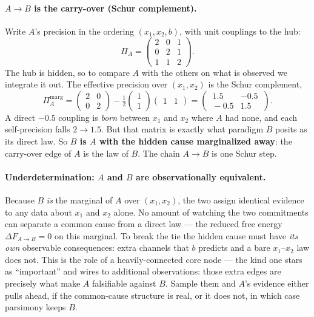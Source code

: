 \paragraph{$A\to B$ is the carry-over (Schur complement).} Write $A$'s
precision in the ordering $(x_1,x_2,b)$, with unit couplings to the hub:
\begin{equation}
\Pi_A=\begin{pmatrix}2&0&1\\0&2&1\\1&1&2\end{pmatrix}.
\end{equation}
The hub is hidden, so to compare $A$ with the others on what is observed
we integrate it out. The effective precision over $(x_1,x_2)$ is the
Schur complement,
\begin{equation}
\Pi_A^{\mathrm{marg}}
=\begin{pmatrix}2&0\\0&2\end{pmatrix}
-\tfrac12\begin{pmatrix}1\\1\end{pmatrix}\begin{pmatrix}1&1\end{pmatrix}
=\begin{pmatrix}\,1.5&-0.5\,\\[1pt]\,-0.5&1.5\,\end{pmatrix}.
\end{equation}
A direct $-0.5$ coupling is \emph{born} between $x_1$ and $x_2$ where $A$
had none, and each self-precision falls $2\to1.5$. But that matrix is
exactly what paradigm $B$ posits as its direct law. So \textbf{$B$ is $A$
with the hidden cause marginalized away}: the carry-over edge of $A$ is
the law of $B$. The chain $A\to B$ is one Schur step.

\paragraph{Underdetermination: $A$ and $B$ are observationally
equivalent.} Because $B$ \emph{is} the marginal of $A$ over $(x_1,x_2)$,
the two assign identical evidence to any data about $x_1$ and $x_2$
alone. No amount of watching the two commitments can separate a common
cause from a direct law --- the reduced free energy
$\Delta F_{A\to B}=0$ on this marginal. To break the tie the hidden cause
must have \emph{its own} observable consequences: extra channels that $b$
predicts and a bare $x_1$--$x_2$ law does not. This is the role of a
heavily-connected core node --- the kind one stars as ``important'' and
wires to additional observations: those extra edges are precisely what
make $A$ falsifiable against $B$. Sample them and $A$'s evidence either
pulls ahead, if the common-cause structure is real, or it does not, in
which case parsimony keeps $B$.

